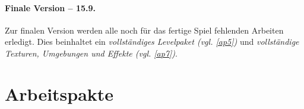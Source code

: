 \paragraph{Finale Version -- 15.9.}
\noindent
Zur finalen Version werden alle noch für das fertige Spiel fehlenden Arbeiten erledigt. Dies beinhaltet ein \textit{vollständiges Levelpaket (vgl. \ref{ap5})} und \textit{vollständige Texturen, Umgebungen und Effekte (vgl. \ref{ap7})}.
\section{Arbeitspakte}

